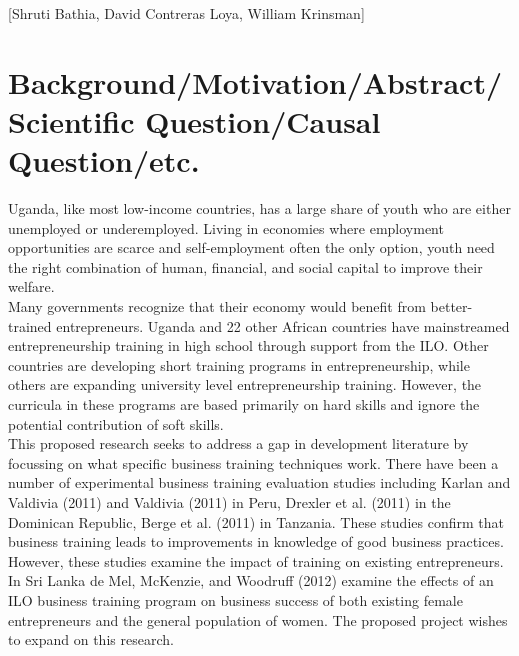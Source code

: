 \documentclass[oneside, notitlepage]{book}
\begin{document}
[Shruti Bathia, David Contreras Loya, William Krinsman]


\section{Background/Motivation/Abstract/Scientific Question/Causal Question/etc.}
\label{cha:backgr-quest-quest}

Uganda, like most low-income countries, has a large share of youth who are either unemployed or underemployed. Living in economies where employment opportunities are scarce and self-employment often the only option, youth need the right combination of human, financial, and social capital to improve their welfare.\\

Many governments recognize that their economy would benefit from better-trained entrepreneurs. Uganda and 22 other African countries have mainstreamed entrepreneurship training in high school through support from the ILO. Other countries are developing short training programs in entrepreneurship, while others are expanding university level entrepreneurship training. However, the curricula in these programs are based primarily on hard skills and ignore the potential contribution of soft skills.\\

This proposed research seeks to address a gap in development literature by focussing on what specific business training techniques work. There have been a number of experimental business training evaluation studies including Karlan and Valdivia (2011) and Valdivia (2011) in Peru, Drexler et al. (2011) in the Dominican Republic, Berge et al. (2011) in Tanzania. These studies confirm that business training leads to improvements in knowledge of good business practices. However, these studies examine the impact of training on existing entrepreneurs. In Sri Lanka de Mel, McKenzie, and Woodruff (2012) examine the effects of an ILO business training program on business success of both existing female entrepreneurs and the general population of women. The proposed project wishes to expand on this research. \\
\end{document}

